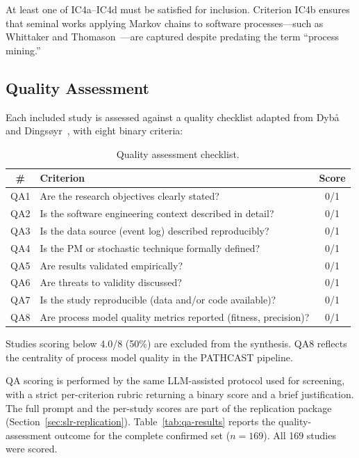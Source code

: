 At least one of IC4a--IC4d must be satisfied for inclusion. Criterion IC4b
ensures that seminal works applying Markov chains to software processes---such
as Whittaker and Thomason~\cite{whittaker1994}---are captured despite
predating the term ``process mining.''


\subsection{Quality Assessment}
\label{sec:slr-qa}

Each included study is assessed against a quality checklist adapted from
Dyb{\aa} and Dings{\o}yr~\cite{dyba2008}, with eight binary criteria:

\begin{table}[htbp]
\centering
\caption{Quality assessment checklist.}
\label{tab:qa}
\begin{tabular}{clc}
\toprule
\textbf{\#} & \textbf{Criterion} & \textbf{Score} \\
\midrule
QA1 & Are the research objectives clearly stated?                    & 0/1 \\
QA2 & Is the software engineering context described in detail?       & 0/1 \\
QA3 & Is the data source (event log) described reproducibly?         & 0/1 \\
QA4 & Is the PM or stochastic technique formally defined?            & 0/1 \\
QA5 & Are results validated empirically?                             & 0/1 \\
QA6 & Are threats to validity discussed?                             & 0/1 \\
QA7 & Is the study reproducible (data and/or code available)?        & 0/1 \\
QA8 & Are process model quality metrics reported (fitness, precision)?& 0/1 \\
\bottomrule
\end{tabular}
\end{table}

Studies scoring below 4.0/8 (50\%) are excluded from the synthesis. QA8
reflects the centrality of process model quality in the PATHCAST pipeline.

QA scoring is performed by the same LLM-assisted protocol used for
screening, with a strict per-criterion rubric returning a binary score
and a brief justification. The full prompt and the per-study scores are
part of the replication package (Section~\ref{sec:slr-replication}).
Table~\ref{tab:qa-results} reports the quality-assessment outcome for the
complete confirmed set ($n = 169$). All 169 studies were scored.

